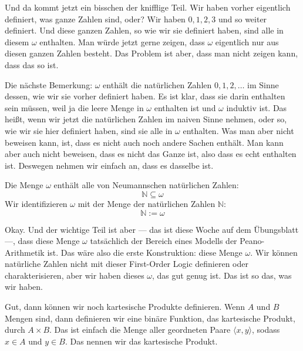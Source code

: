 \begin{spoken-clean}[00:49:23 - 00:51:19]
Und da kommt jetzt ein bisschen der knifflige Teil. Wir haben vorher eigentlich definiert, was ganze Zahlen sind, oder? Wir haben $0, 1, 2, 3$ und so weiter definiert. Und diese ganzen Zahlen, so wie wir sie definiert haben, sind alle in diesem $\omega$ enthalten. Man würde jetzt gerne zeigen, dass $\omega$ eigentlich nur aus diesen ganzen Zahlen besteht. Das Problem ist aber, dass man nicht zeigen kann, dass das so ist.

Die nächste Bemerkung: $\omega$ enthält die natürlichen Zahlen $0, 1, 2, \dots$ im Sinne dessen, wie wir sie vorher definiert haben. Es ist klar, dass sie darin enthalten sein müssen, weil ja die leere Menge in $\omega$ enthalten ist und $\omega$ induktiv ist. Das heißt, wenn wir jetzt die natürlichen Zahlen im naiven Sinne nehmen, oder so, wie wir sie hier definiert haben, sind sie alle in $\omega$ enthalten. Was man aber nicht beweisen kann, ist, dass es nicht auch noch andere Sachen enthält. Man kann aber auch nicht beweisen, dass es nicht das Ganze ist, also dass es echt enthalten ist. Deswegen nehmen wir einfach an, dass es dasselbe ist.
\end{spoken-clean}

\begin{math-stroke}
\begin{remark}
Die Menge $\omega$ enthält alle von Neumannschen natürlichen Zahlen:
\[
\mathbb{N} \subseteq \omega
\]
Wir identifizieren $\omega$ mit der Menge der natürlichen Zahlen $\mathbb{N}$:
\[
\mathbb{N} := \omega
\]
\end{remark}
\end{math-stroke}

\begin{spoken-clean}[00:51:19 - 00:53:29]
Okay. Und der wichtige Teil ist aber --- das ist diese Woche auf dem Übungsblatt ---, dass diese Menge $\omega$ tatsächlich der Bereich eines Modells der Peano-Arithmetik ist. Das wäre also die erste Konstruktion: diese Menge $\omega$. Wir können natürliche Zahlen nicht mit dieser First-Order Logic definieren oder charakterisieren, aber wir haben dieses $\omega$, das gut genug ist. Das ist so das, was wir haben.

Gut, dann können wir noch kartesische Produkte definieren. Wenn $A$ und $B$ Mengen sind, dann definieren wir eine binäre Funktion, das kartesische Produkt, durch $A \times B$. Das ist einfach die Menge aller geordneten Paare $\langle x, y \rangle$, sodass $x \in A$ und $y \in B$. Das nennen wir das kartesische Produkt.
\end{spoken-clean}

